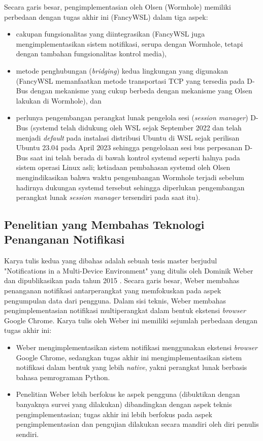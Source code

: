 Secara garis besar, pengimplementasian oleh Olsen (Wormhole) memiliki perbedaan dengan tugas akhir ini (FancyWSL) dalam tiga aspek:
\begin{itemize}
    \item cakupan fungsionalitas yang diintegrasikan (FancyWSL juga mengimplementasikan sistem notifikasi, serupa dengan Wormhole, tetapi dengan tambahan fungsionalitas kontrol media),
    \item metode penghubungan (\textit{bridging}) kedua lingkungan yang digunakan (FancyWSL memanfaatkan metode transportasi TCP yang tersedia pada D-Bus dengan mekanisme yang cukup berbeda dengan mekanisme yang Olsen lakukan di Wormhole), dan
    \item perlunya pengembangan perangkat lunak pengelola sesi (\textit{session manager}) D-Bus (systemd telah didukung oleh WSL sejak September 2022 \cite{systemd-support-is-now-available-in-wsl} dan telah menjadi \textit{default} pada instalasi distribusi Ubuntu di WSL sejak perilisan Ubuntu 23.04 pada April 2023 \cite{ubuntu-2304-release-roundup-systemd-now-becomes-default-for-ubuntu-on-wsl} sehingga pengelolaan sesi bus perpesanan D-Bus saat ini telah berada di bawah kontrol systemd seperti halnya pada sistem operasi Linux asli; ketiadaan pembahasan systemd oleh Olsen mengindikasikan bahwa waktu pengembangan Wormhole terjadi sebelum hadirnya dukungan systemd tersebut sehingga diperlukan pengembangan perangkat lunak \textit{session manager} tersendiri pada saat itu).
\end{itemize}

\subsection{Penelitian yang Membahas Teknologi Penanganan Notifikasi}

Karya tulis kedua yang dibahas adalah sebuah tesis master berjudul "Notifications in a Multi-Device Environment" yang ditulis oleh Dominik Weber dan dipublikasikan pada tahun 2015 \cite{weber2015notifications}. Secara garis besar, Weber membahas penanganan notifikasi antarperangkat yang memfokuskan pada aspek pengumpulan data dari pengguna. Dalam sisi teknis, Weber membahas pengimplementasian notifikasi multiperangkat dalam bentuk ekstensi \textit{browser} Google Chrome. Karya tulis oleh Weber ini memiliki sejumlah perbedaan dengan tugas akhir ini:
\begin{itemize}
    \item Weber mengimplementasikan sistem notifikasi menggunakan ekstensi \textit{browser} Google Chrome, sedangkan tugas akhir ini mengimplementasikan sistem notifikasi dalam bentuk yang lebih \textit{native}, yakni perangkat lunak berbasis bahasa pemrograman Python.

    \item Penelitian Weber lebih berfokus ke aspek pengguna (dibuktikan dengan banyaknya survei yang dilakukan) dibandingkan dengan aspek teknis pengimplementasian; tugas akhir ini lebih berfokus pada aspek pengimplementasian dan pengujian dilakukan secara mandiri oleh diri penulis sendiri.
\end{itemize}

